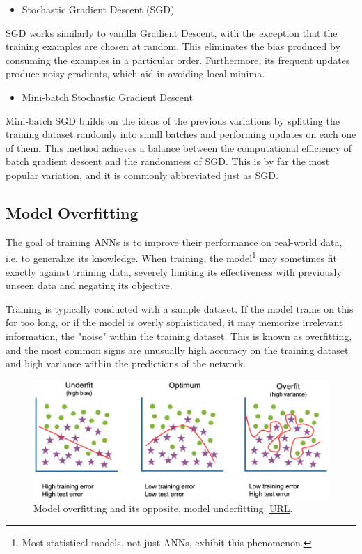 \begin{itemize}[resume]
    \item Stochastic Gradient Descent (SGD)
\end{itemize}
SGD works similarly to vanilla Gradient Descent, with the exception that the training examples are chosen at random. This eliminates the bias produced by consuming the examples in a particular order. Furthermore, its frequent updates produce noisy gradients, which aid in avoiding local minima.
    
\begin{itemize}[resume]
    \item Mini-batch Stochastic Gradient Descent
\end{itemize}
Mini-batch SGD builds on the ideas of the previous variations by splitting the training dataset randomly into small batches and performing updates on each one of them. This method achieves a balance between the computational efficiency of batch gradient descent and the randomness of SGD. This is by far the most popular variation, and it is commonly abbreviated just as SGD.

\subsection{Model Overfitting}
The goal of training ANNs is to improve their performance on real-world data, i.e. to generalize its knowledge. When training, the model\footnote{Most statistical models, not just ANNs, exhibit this phenomenon.} may sometimes fit exactly against training data, severely limiting its effectiveness with previously unseen data and negating its objective.

Training is typically conducted with a sample dataset. If the model trains on this for too long, or if the model is overly sophisticated, it may memorize irrelevant information, the "noise" within the training dataset. This is known as overfitting\cite{IBM_overfitting}, and the most common signs are unusually high accuracy on the training dataset and high variance within the predictions of the network.
\begin{figure}[H]
    \centering
        \includegraphics[width=1\textwidth]{Images/diagrams/model-over-fitting.png}
        \decoRule
        \caption[Model overfitting]{Model overfitting and its opposite, model underfitting: \href{https://www.ibm.com/cloud/learn/overfitting}{URL}.}
        \label{fig:Model overfitting}
\end{figure}

